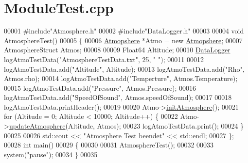 \hypertarget{_module_test_8cpp_source}{}\section{Module\+Test.\+cpp}
\label{_module_test_8cpp_source}

\begin{DoxyCode}
00001 \textcolor{preprocessor}{#include"Atmosphere.h"}
00002 \textcolor{preprocessor}{#include"DataLogger.h"}
00003 
00004 \textcolor{keywordtype}{void} AtmosphereTest()
00005 \{
00006     \hyperlink{group___atmosphere_class_atmopshere}{Atmopshere} *Atmo = \textcolor{keyword}{new} \hyperlink{group___atmosphere_class_atmopshere}{Atmopshere};
00007     AtmosphereStruct Atmos;
00008 
00009     Float64 Altitude;
00010     \hyperlink{class_data_logger}{DataLogger} logAtmoTestData(\textcolor{stringliteral}{"AtmosphereTestData.txt"}, 25, \textcolor{stringliteral}{" "});
00011 
00012     logAtmoTestData.add(\textcolor{stringliteral}{"Altitude"}, Altitude);
00013     logAtmoTestData.add(\textcolor{stringliteral}{"Rho"}, Atmos.rho);
00014     logAtmoTestData.add(\textcolor{stringliteral}{"Temperture"}, Atmos.Temperature);
00015     logAtmoTestData.add(\textcolor{stringliteral}{"Pressure"}, Atmos.Pressure);
00016     logAtmoTestData.add(\textcolor{stringliteral}{"SpeedOfSound"}, Atmos.speedOfSound);
00017 
00018     logAtmoTestData.printHeader();
00019 
00020     Atmo->\hyperlink{group___atmosphere_a6e1d5763fbb6631784c99ee3c88911bd}{initAtmosphere}();
00021     \textcolor{keywordflow}{for} (Altitude = 0; Altitude < 10000; Altitude++) \{
00022         Atmo->\hyperlink{group___atmosphere_a2bd97471d32725d6196ee6816ea36c99}{updateAtmosphere}(Altitude, Atmos);
00023         logAtmoTestData.print();
00024     \}
00025 
00026     std::cout << \textcolor{stringliteral}{"Atmosphere Test beendet"} << std::endl;
00027 \};
00028 \textcolor{keywordtype}{int} main()
00029 \{
00030     
00031     AtmosphereTest();
00032 
00033     system(\textcolor{stringliteral}{"pause"});
00034 \}
00035 
\end{DoxyCode}
